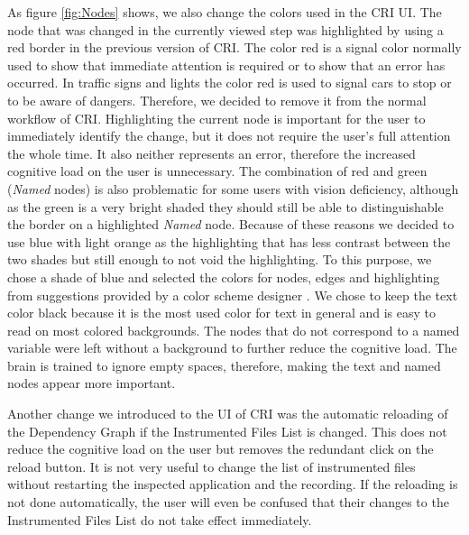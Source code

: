 As figure \ref{fig:Nodes} shows, we also change the colors used in the CRI UI. The node that was changed in the currently viewed step was highlighted by using a red border in the previous version of CRI. The color red is a signal color normally used to show that immediate attention is required or to show that an error has occurred. In traffic signs and lights the color red is used to signal cars to stop or to be aware of dangers. Therefore, we decided to remove it from the normal workflow of CRI. Highlighting the current node is important for the user to immediately identify the change, but it does not require the user's full attention the whole time. It also neither represents an error, therefore the increased cognitive load on the user is unnecessary. The combination of red and green (\emph{Named} nodes) is also problematic for some users with vision deficiency, although as the green is a very bright shaded they should still be able to distinguishable the border on a highlighted \emph{Named} node. Because of these reasons we decided to use blue with light orange as the highlighting that has less contrast between the two shades but still enough to not void the highlighting. To this purpose, we chose a shade of blue and selected the colors for nodes, edges and highlighting from suggestions provided by a color scheme designer \cite{Paletton}. We chose to keep the text color black because it is the most used color for text in general and is easy to read on most colored backgrounds. The nodes that do not correspond to a named variable were left without a background to further reduce the cognitive load. The brain is trained to ignore empty spaces, therefore, making the text and named nodes appear more important.

Another change we introduced to the UI of CRI was the automatic reloading of the Dependency Graph if the Instrumented Files List is changed. This does not reduce the cognitive load on the user but removes the redundant click on the reload button. It is not very useful to change the list of instrumented files without restarting the inspected application and the recording. If the reloading is not done automatically, the user will even be confused that their changes to the Instrumented Files List do not take effect immediately.
	

